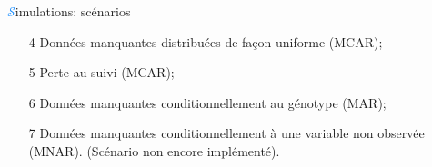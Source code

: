 \begin{frame}{{\huge\textcolor{dodgerblue}{$\mathcal{S}$}}imulations: scénarios}
\par{%
\begin{enumerate}
    \item[4] Données manquantes distribuées de façon uniforme (\textcolor{springgreen3}{MCAR});
    \item[5] Perte au suivi (\textcolor{springgreen3}{MCAR});
    \item[6] Données manquantes conditionnellement au génotype (\textcolor{springgreen3}{MAR});
    \item[7] Données manquantes conditionnellement à une variable non observée (\textcolor{springgreen3}{MNAR}). (Scénario non encore implémenté).
\end{enumerate}
}
\end{frame}


